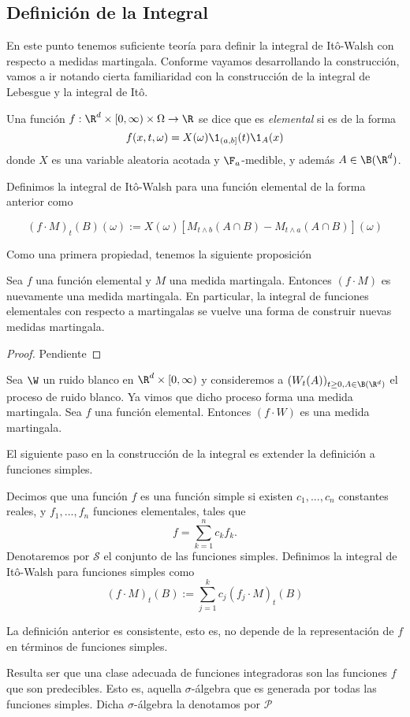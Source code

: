 \subsection{Definición de la Integral}
En este punto tenemos suficiente teoría para definir la integral de Itô-Walsh con respecto a medidas martingala. Conforme vayamos desarrollando la construcción, vamos a ir notando cierta familiaridad con la construcción de la integral de Lebesgue y la integral de Itô.

\begin{dfn} 
Una función $f:\R^{d}\times [0,\infty)\times \Omega\to \R$ se dice que es \textit{elemental} si es de la forma 
\[
   f(x,t,\omega)=X(\omega)\1_{(a,b]}(t)\1_A(x) 
\]
donde $X$ es una variable aleatoria acotada y $\F_a$-medible, y además $A\in \B(\R^{d})$. 

Definimos la integral de Itô-Walsh para una función elemental de la forma anterior como 

\[
(f\cdot M)_t(B)(\omega):= X(\omega)\left[M_{t\wedge b}(A\cap B)-M_{t\wedge a}(A\cap B)\right](\omega)  
\]
\end{dfn}

Como una primera propiedad, tenemos la siguiente proposición
\begin{prop} 
Sea $f$ una función elemental y $M$ una medida martingala. Entonces $(f\cdot M)$ es nuevamente una medida martingala. En particular, la integral de funciones elementales con respecto a martingalas se vuelve una forma de construir nuevas medidas martingala.
\end{prop}
\begin{proof} 
 Pendiente 
\end{proof}
\begin{ejem} 
Sea $\W$ un ruido blanco en $\R^{d}\times[0,\infty)$ y consideremos a $(W_t(A))_{t\geq0,A\in \B(\R^d)}$ el proceso de ruido blanco. Ya vimos que dicho proceso forma una medida martingala. Sea $f$ una función elemental. Entonces $(f\cdot W)$ es una medida martingala.
\end{ejem}

El siguiente paso en la construcción de la integral es extender la definición a funciones simples. 

\begin{dfn} 
   Decimos que una función $f$ es una función simple si existen $c_1,...,c_n$ constantes reales, y $f_1,...,f_n$ funciones elementales, tales que 
   \[
     f=\sum_{k=1}^{n}c_kf_k.  
   \] Denotaremos por $\mathscr{S}$ el conjunto de las funciones simples. Definimos la integral de Itô-Walsh para funciones simples como 
   \[
   (f\cdot M)_t(B):=\sum_{j=1}^{k}c_j(f_j\cdot M)_t(B)    
   \]
 \end{dfn}
 \begin{prop} 
  La definición anterior es consistente, esto es, no depende de la representación de $f$ en términos de funciones simples.
  \end{prop}
Resulta ser que una clase adecuada de funciones integradoras son las funciones $f$ que son predecibles. Esto es, aquella $\sigma$-álgebra que es generada por todas las funciones simples. Dicha $\sigma$-álgebra la denotamos por $\mathscr{P}$

